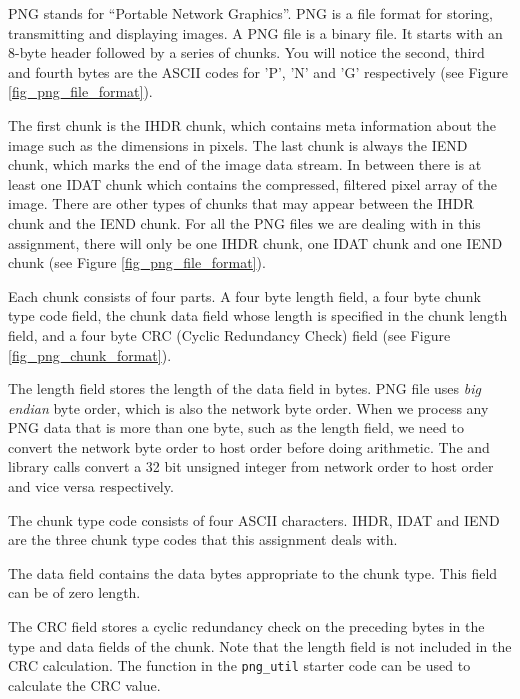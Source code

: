 PNG stands for ``Portable Network Graphics''. PNG is a file format for storing, transmitting and displaying images\cite{Roelofs1999PNG}. A PNG file is a binary file. It starts with an 8-byte header followed by a series of chunks. You will notice the second, third and fourth bytes are the ASCII codes for 'P', 'N' and 'G' respectively (see Figure \ref{fig_png_file_format}).

The first chunk is the IHDR chunk, which contains meta information about the image such as the dimensions in pixels. The last chunk is always the IEND chunk, which marks the end of the image data stream. In between there is at least one IDAT chunk which contains the compressed, filtered pixel array of the image. There are other types of chunks that may appear between the IHDR chunk and the IEND chunk. For all the PNG files we are dealing with in this assignment, there will only be one IHDR chunk, one IDAT chunk and one IEND chunk (see Figure \ref{fig_png_file_format}).


Each chunk consists of four parts. A four byte length field, a four byte chunk type code field, the chunk data field whose length is specified in the chunk length field, and a four byte CRC (Cyclic Redundancy Check) field (see Figure \ref{fig_png_chunk_format}).

The length field stores the length of the data field in bytes. PNG file uses {\em big endian} byte order, which is also the network byte order. When we process any PNG data that is more than one byte, such as the length field, we need to convert the network byte order to host order before doing arithmetic. The  and  library calls convert a 32 bit unsigned integer from network order to host order and vice versa respectively.



The chunk type code consists of four ASCII characters. IHDR, IDAT and IEND are the three chunk type codes that this assignment deals with.

The data field contains the data bytes appropriate to the chunk type. This field can be of zero length.

The CRC field stores a cyclic redundancy check on the preceding bytes in the type and data fields of the chunk. Note that the length field is not included in the CRC calculation. The  function in the \verb+png_util+ starter code can be used to calculate the CRC value.

